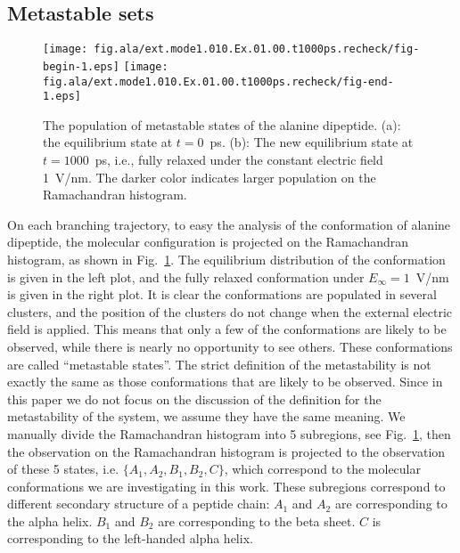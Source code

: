 \documentclass[a4paper,preprint,unsortedaddress,onecolumn]{revtex4-1}
\begin{document}

\subsection{Metastable sets}

\begin{figure}
  \centering
  \texttt{[image: fig.ala/ext.mode1.010.Ex.01.00.t1000ps.recheck/fig-begin-1.eps]}
  \texttt{[image: fig.ala/ext.mode1.010.Ex.01.00.t1000ps.recheck/fig-end-1.eps]}
  \caption{The population of metastable states of the alanine dipeptide.
    (a): the
    equilibrium state at $t=0$~\textsf{ps}. (b): The new equilibrium
    state at $t=1000$~\textsf{ps}, i.e., fully relaxed under the
    constant electric field 1~V/nm. The darker color
    indicates larger population on the Ramachandran histogram.}
  \label{fig:tmp4}
\end{figure}


On each branching trajectory, to easy the analysis of the conformation
of alanine dipeptide, the molecular configuration is projected on
the Ramachandran histogram, as
shown in Fig.~\ref{fig:tmp4}. The equilibrium distribution of the
conformation is given in the left plot, and the fully relaxed
conformation under $E_{\infty} = 1$~V/nm is given in the right plot.  It is
clear the conformations are populated in several clusters, and the
position of the clusters do not change when the external electric
field is applied.
This means that only a few of the conformations are likely to be observed,
while there is nearly no opportunity to see others. 
These conformations are called ``metastable states''.
The strict definition of the
metastability is not exactly the same as those conformations that are likely to be observed.
Since in this paper we do not focus on the discussion of the definition for the metastability of the system,
we assume they have the same meaning.
We manually divide the
Ramachandran histogram into 5 subregions, see Fig.~\ref{fig:tmp4},
then the observation on the Ramachandran histogram is projected to the
observation of these 5 states, i.e. $\{A_1, A_2, B_1, B_2, C\}$, which
correspond to the molecular conformations we are investigating in this work.
These subregions
correspond to different secondary structure of a peptide chain:
$A_1$ and $A_2$ are
corresponding to the alpha helix. $B_1$ and $B_2$ are
corresponding to the beta sheet. $C$ is corresponding to the
left-handed alpha helix.
\end{document}
